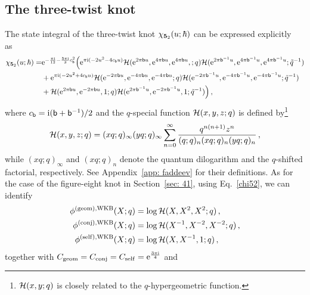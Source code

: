 \documentclass[a4paper,11pt]{article}
\theoremstyle{definition}
\newcommand{\CH}{{\cal H}}
\newcommand{\re}{{\rm e}}
\newcommand{\ri}{{\rm i}}
\def\tq{{\tilde{q}}}
\def\tq{{\tilde{q}}}
\newcommand{\mb}{{\mathsf{b}}}
\newcommand{\be}{\begin{equation}}
\newcommand{\ee}{\end{equation}}
\newcommand{\ba}{\begin{aligned}}
\newcommand{\ea}{\end{aligned}}
\begin{document}
\subsection{The three-twist knot} \label{sec: 52}
The state integral of the three-twist knot $\chi_{{\bf{5}}_2}(u;\hbar)$ can be expressed explicitly as~\cite{bdp,dimofte-levelk,ggm2}
%
 \be \label{chi52}
 \ba
 \chi_{{\bf{5}}_2}(u;\hbar)=&\re^{-\frac{\pi\ri}{12}-\frac{5\pi\ri}{3}c_\mb^2}\Big(
    \re^{\pi\ri(-2u^2-4c_\mb u)}
     \CH(\re^{2 \pi \mb u},\re^{4 \pi \mb u},\re^{4 \pi \mb u}, ;q)
     \CH(\re^{2 \pi \mb^{-1} u},\re^{4 \pi \mb^{-1} u},\re^{4 \pi \mb^{-1} u};\tq^{-1})\\
      &+\re^{\pi\ri(-2u^2+4c_\mb u)}
     \CH(\re^{-2 \pi \mb u},\re^{-4 \pi \mb u},\re^{-4 \pi \mb u};q)
     \CH(\re^{-2 \pi \mb^{-1} u},\re^{-4 \pi \mb^{-1} u},\re^{-4 \pi \mb^{-1} u};\tq^{-1}) \\
     &+\CH(\re^{2 \pi \mb u},\re^{-2 \pi \mb u},1;q)
     \CH(\re^{2 \pi \mb^{-1} u},\re^{-2 \pi \mb^{-1} u},1;\tq^{-1})
      \Big) \, ,
\ea
\ee
%
where $c_{\mb}= \ri (\mb + \mb^{-1})/2$ and the $q$-special function $\CH(x,y,z;q)$ is defined by\footnote{$\CH(x,y;q)$ is closely related to the $q$-hypergeometric function.} 
%
  \begin{equation}
    \CH(x,y,z;q) = (x q;q)_\infty (y q;q)_\infty \sum_{n=0}^\infty \frac{q^{n(n+1)} z^n}{(q;q)_n (x q;q)_n (y q;q)_n} \, ,
  \end{equation}
%
while $(x q;q)_\infty$ and $(x q;q)_n$ denote the quantum dilogarithm and the $q$-shifted factorial, respectively. See Appendix~\ref{app: faddeev} for their definitions.
As for the case of the figure-eight knot in Section~\ref{sec: 41}, using Eq.~\eqref{chi52}, we can identify 
%
\begin{subequations}
\begin{align}
  \phi^{(\rm{geom}), \rm{WKB}}(X;q)& =  \log \CH(X,X^2,X^2;q) \, , \label{phi52geom} \\
  \phi^{(\rm{conj}), \rm{WKB}}(X;q) &=  \log \CH(X^{-1},X^{-2},X^{-2};q) \, , \label{phi52conj} \\
  \phi^{(\rm{self}), \rm{WKB}}(X;q) &=  \log \CH(X,X^{-1},1;q) \, , \label{phi52self}
\end{align}
\end{subequations}
together with $C_{\rm{geom}} = C_{\rm{conj}} = C_{\rm{self}} = \re^{\frac{3 \pi \ri}{4}}$ and 
\end{document}
